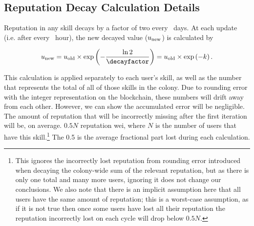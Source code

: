 %
%

\subsection{Reputation Decay Calculation Details}\label{appendix:rep-decay}

Reputation in any skill decays by a factor of two every \repdecayduration\ days. At each update (i.e. after every \miningcycleduration\ hour), the new decayed value ($u_{\rm new}$) is calculated by

$$u_{\rm new} = u_{\rm old} \times \exp\left(-\frac{\ln 2}{\decayfactor}\right) = u_{\rm old} \times \exp\left(-k\right).$$

This calculation is applied separately to each user's skill, as well as the number that represents the total of all of those skills in the colony. Due to rounding error with the integer representation on the blockchain, these numbers will drift away from each other. However, we can show the accumulated error will be negligible. The amount of reputation that will be incorrectly missing after the first iteration will be, on average. $0.5N$ reputation wei, where $N$ is the number of users that have this skill.\footnote{This ignores the incorrectly lost reputation from rounding error introduced when decaying the colony-wide sum of the relevant reputation, but as there is only one total and many more users, ignoring it does not change our conclusions. We also note that there is an implicit assumption here that all users have the same amount of reputation; this is a worst-case assumption, as if it is not true then once some users have lost all their reputation the reputation incorrectly lost on each cycle will drop below $0.5N$.} The 0.5 is the average fractional part lost during each calculation.

